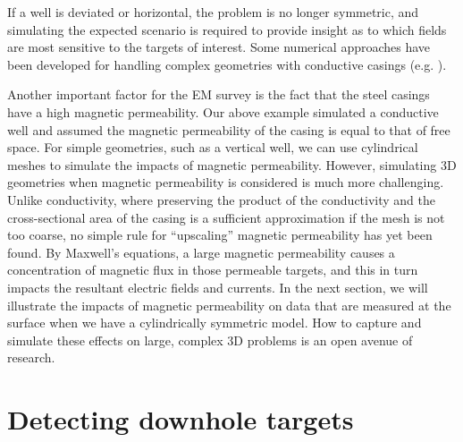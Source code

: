 \documentclass[
    paper
]{geophysics}
\begin{document}


If a well is deviated or horizontal, the problem is no longer symmetric, and simulating the expected scenario is required to provide insight as to which fields are most sensitive to the targets of interest. Some numerical approaches have been developed for handling complex geometries with conductive casings (e.g. \cite{Haber2016, Weiss2017}).

Another important factor for the EM survey is the fact that the steel casings have a high magnetic permeability. Our above example simulated a conductive well and assumed the magnetic permeability of the casing is equal to that of free space. For simple geometries, such as a vertical well, we can use cylindrical meshes to simulate the impacts of magnetic permeability. However, simulating 3D geometries when magnetic permeability is considered is much more challenging. Unlike conductivity, where preserving the product of the conductivity and the cross-sectional area of the casing is a sufficient approximation if the mesh is not too coarse, no simple rule for ``upscaling'' magnetic permeability has yet been found. By Maxwell’s equations, a large magnetic permeability causes a concentration of magnetic flux in those permeable targets, and this in turn impacts the resultant electric fields and currents. In the next section, we will illustrate the impacts of magnetic permeability on data that are measured at the surface when we have  a cylindrically symmetric model. How to capture and simulate these effects on large, complex 3D problems is an open avenue of research.



\section{Detecting downhole targets}
\end{document}

